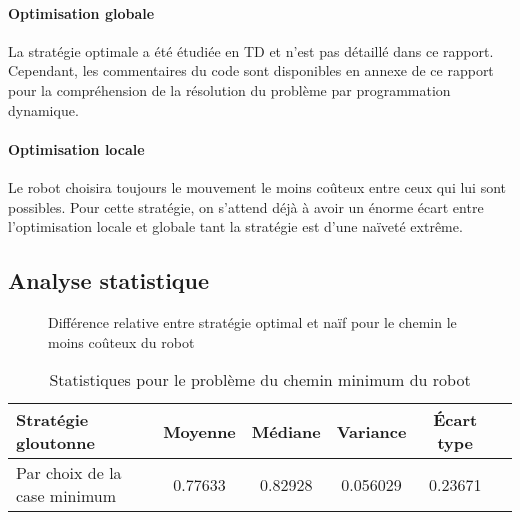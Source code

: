 \documentclass[a4paper,english,french]{article}
\begin{document}
\paragraph*{Optimisation globale} La stratégie optimale a été étudiée en TD et n'est pas détaillé dans ce rapport. Cependant, les commentaires du code sont disponibles en annexe de ce rapport pour la compréhension de la résolution du problème par programmation dynamique.

\paragraph*{Optimisation locale} Le robot choisira toujours le mouvement le moins coûteux entre ceux qui lui sont possibles. Pour cette stratégie, on s'attend déjà à avoir un énorme écart entre l'optimisation locale et globale tant la stratégie est d'une naïveté extrême.

\subsection*{Analyse statistique}

\begin{figure}
\centering
{}
\caption{Différence relative entre stratégie optimal et naïf pour le chemin le moins coûteux du robot}
\end{figure}

\begin{center}
\begin{table}[htbp]
  \centering
    \begin{tabular}{lccccc}
        \toprule
        Stratégie gloutonne                & Moyenne   & Médiane       & Variance     & Écart type    \\
        \midrule
        Par choix de la case minimum  & 0.77633   & 0.82928      & 0.056029       & 0.23671      \\
        \bottomrule
    \end{tabular}
    \caption{Statistiques pour le problème du chemin minimum du robot}
\end{table}
\end{center}
\end{document}
